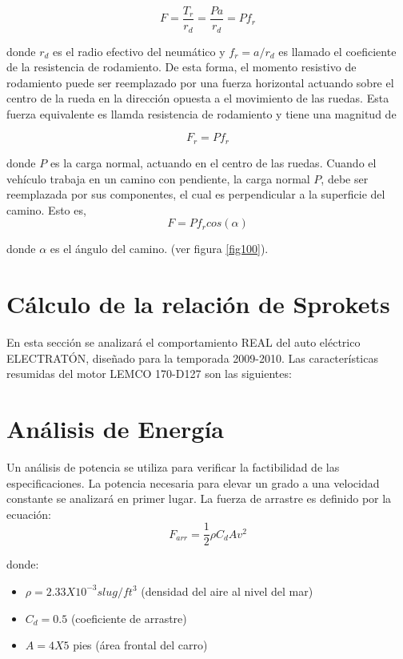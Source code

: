 \documentclass[12pt]{book}
\theoremstyle{definition}
\theoremstyle{remark}
\theoremstyle{plain}
\begin{document}
\begin{equation}
 \label{equ102}
F=\frac{T_r}{r_d}=\frac{P a}{r_d}=P f_r
\end{equation} 

donde $r_d$ es el radio efectivo del neumático y $f_r=a/r_d$ es llamado el coeficiente de 
la resistencia de rodamiento. De esta forma, el momento resistivo de rodamiento puede ser 
reemplazado por una fuerza horizontal actuando sobre el centro de la rueda en la dirección 
opuesta a el movimiento de las ruedas. Esta fuerza equivalente es llamda resistencia de 
rodamiento y tiene una magnitud de

\begin{equation}
 \label{equ103}
F_r= P f_r
\end{equation} 

donde $P$ es la carga normal, actuando en el centro de las ruedas. Cuando el vehículo trabaja 
en un camino con pendiente, la carga normal $P$, debe ser reemplazada por sus componentes,
el cual es perpendicular a la superficie del camino. Esto es,
\begin{equation}
 \label{equ104}
F= P f_r cos (\alpha)
\end{equation} 

donde $\alpha$ es el ángulo del camino. (ver figura \ref{fig100}).

\section{Cálculo de la relación de Sprokets}

En esta sección se analizará el comportamiento REAL del auto eléctrico ELECTRATÓN, diseñado para la temporada 2009-2010. 
Las características resumidas del motor LEMCO 170-D127 son las siguientes:


\section{Análisis de Energía}

Un análisis de potencia se utiliza para verificar la factibilidad de las especificaciones. La potencia necesaria para elevar un grado a una velocidad constante se analizará 
en primer lugar. La fuerza de arrastre es definido por la ecuación:
\begin{equation}
\label{equ200}
F_{arr}=\frac{1}{2} \rho C_d A v^2
\end{equation}

donde:

\begin{itemize}
\item $\rho = 2.33X10^{-3}  slug/ft^3$ (densidad del aire al nivel del mar)
\item $C_d=0.5$ (coeficiente de arrastre)
\item $A= 4X5$ pies (área frontal del carro)
\end{itemize}
\end{document}
